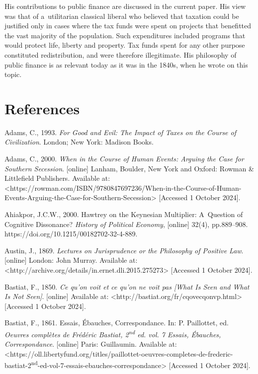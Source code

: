 His contributions to public finance are discussed in the current paper. His view was that of a~utilitarian classical liberal who believed that taxation could be justified only in cases where the tax funds were spent on projects that benefitted the vast majority of the population. Such expenditures included programs that would protect life, liberty and property. Tax funds spent for any other purpose constituted redistribution, and were therefore illegitimate. His philosophy of public finance is as relevant today as it was in the 1840s, when he wrote on this topic.



\section{References}

Adams, C., 1993. \textit{For Good and Evil: The Impact of Taxes on the Course of Civilization}. London; New York: Madison Books.



Adams, C., 2000. \textit{When in the Course of Human Events: Arguing the Case for Southern Secession}. [online] Lanham, Boulder, New York and Oxford: Rowman \& Littlefield Publishers. Available at: {\textless}https://rowman.com/ISBN/9780847697236/When-in-the-Course-of-Human-Events-Arguing-the-Case-for-Southern-Secession{\textgreater} [Accessed 1 October 2024].



Ahiakpor, J.C.W., 2000. Hawtrey on the Keynesian Multiplier: A~Question of Cognitive Dissonance? \textit{History of Political Economy}, [online] 32(4), pp.889–908. https://doi.org/10.1215/00182702-32-4-889.



Austin, J., 1869. \textit{Lectures on Jurisprudence or the Philosophy of Positive Law}. [online] London: John Murray. Available at: {\textless}http://archive.org/details/in.ernet.dli.2015.275273{\textgreater} [Accessed 1 October 2024].



Bastiat, F., 1850. \textit{Ce qu'on voit et ce qu'on ne voit pas [What Is Seen and What Is Not Seen]}. [online] Available at: {\textless}http://bastiat.org/fr/cqovecqonvp.html{\textgreater} [Accessed 1 October 2024].



Bastiat, F., 1861. Essais, Ébauches, Correspondance. In: P. Paillottet, ed. \textit{Oeuvres complètes de Frédéric Bastiat, 2\textsuperscript{nd} ed. vol. 7 Essais, Ébauches, Correspondance}. [online] Paris: Guillaumin. Available at: {\textless}https://oll.libertyfund.org/titles/paillottet-oeuvres-completes-de-frederic-bastiat-2\textsuperscript{nd}-ed-vol-7-essais-ebauches-correspondance{\textgreater} [Accessed 1 October 2024].



